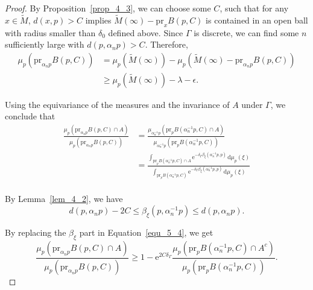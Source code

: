 \documentclass[reqno,11pt]{article}
\theoremstyle{definition}
\theoremstyle{remark}
\numberwithin{equation}{section}
\begin{document}
\begin{proof}
	By Proposition~\ref{prop_4_3}, we can choose some $C$, such that for any $x\in\widetilde{M}$, $d(x,p)>C$ implies $\widetilde{M}(\infty)-\text{pr}_x B(p,C)$ is contained in an open ball with radius smaller than $\delta_0$ defined above. Since $\Gamma$ is discrete, we can find some $n$ sufficiently large with $d(p,\alpha_n p)>C$. Therefore,
	\begin{equation}\label{equ_5_3}
		\begin{aligned}
			\mu_p(\text{pr}_{\alpha_n p}B(p,C)) & =\mu_p(\widetilde{M}(\infty))-\mu_p(\widetilde{M}(\infty)-\text{pr}_{\alpha_n p}B(p,C)) \\
			                                    & \geq\mu_p(\widetilde{M}(\infty))-\lambda-\epsilon.
		\end{aligned}
	\end{equation}

	Using the equivariance of the measures and the invariance of $A$ under $\Gamma$, we conclude that
	\begin{equation}\label{equ_5_4}
		\begin{aligned}
			\frac{\mu_p(\text{pr}_{\alpha_n p} B(p,C)\cap A)}{\mu_p(\text{pr}_{\alpha_n p} B(p,C))} & =\frac{\mu_{\alpha_n^{-1}p}(\text{pr}_p B(\alpha_n^{-1}p,C)\cap A)}{\mu_{\alpha_n^{-1}p}(\text{pr}_{p} B(\alpha_n^{-1}p,C))}                                                                                                                             \\
			                                                                                        & =\frac{\int_{\text{pr}_p B(\alpha_n^{-1}p,C)\cap A}\mathrm{e}^{-\delta_\Gamma\beta_{\xi}(\alpha_n^{-1}p,p)}\,\mathrm{d}\mu_p(\xi)}{\int_{\text{pr}_p B(\alpha_n^{-1}p,C)}\mathrm{e}^{-\delta_\Gamma\beta_{\xi}(\alpha_n^{-1}p,p)}\,\mathrm{d}\mu_p(\xi)} \\
		\end{aligned}
	\end{equation}

	By Lemma~\ref{lem_4_2}, we have
	\begin{displaymath}
		d(p,\alpha_n p)-2C\leq\beta_{\xi}(p,\alpha_n^{-1}p)\leq d(p,\alpha_n p).
	\end{displaymath}

	By replacing the $\beta_{\xi}$ part in Equation~\ref{equ_5_4}, we get
	\begin{displaymath}
		\frac{\mu_p(\text{pr}_{\alpha_n p} B(p,C)\cap A)}{\mu_p(\text{pr}_{\alpha_n p} B(p,C))}\geq 1-\mathrm{e}^{2C\delta_\Gamma}\frac{\mu_p(\text{pr}_p B(\alpha_n^{-1}p,C)\cap A^c)}{\mu_p(\text{pr}_p B(\alpha_n^{-1}p,C))}.
	\end{displaymath}


\end{proof}
\end{document}
